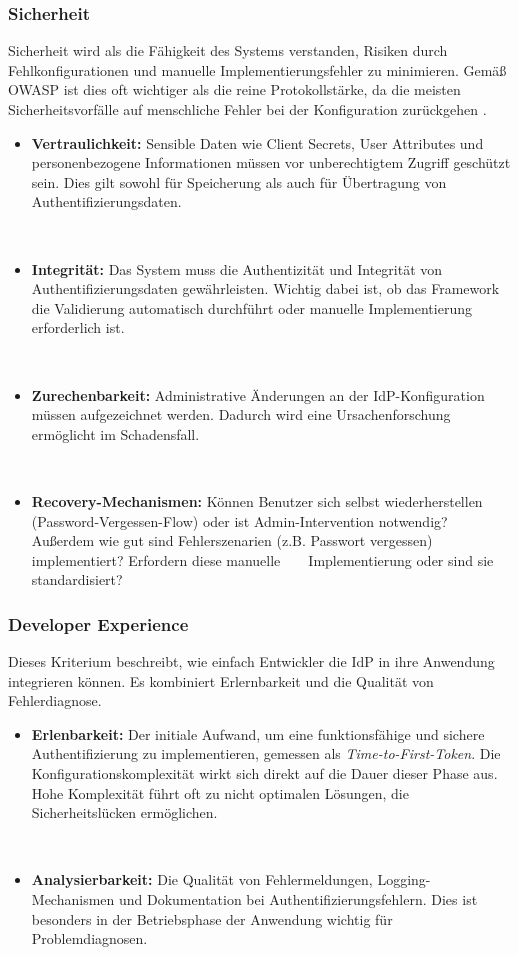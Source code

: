 \subsubsection{Sicherheit}

Sicherheit wird als die Fähigkeit des Systems verstanden, Risiken durch Fehlkonfigurationen und manuelle Implementierungsfehler zu minimieren. Gemäß \ac{OWASP} ist dies oft wichtiger als die reine Protokollstärke, da die meisten Sicherheitsvorfälle auf menschliche Fehler bei der Konfiguration zurückgehen \citep{Dietrich2018}.

\begin{itemize}
    \item \textbf{Vertraulichkeit:} Sensible Daten wie Client Secrets, User Attributes und personenbezogene Informationen müssen vor unberechtigtem Zugriff geschützt sein. Dies gilt sowohl für Speicherung als auch für Übertragung von Authentifizierungsdaten.

    \item \textbf{Integrität:} Das System muss die Authentizität und Integrität von Authentifizierungsdaten gewährleisten. Wichtig dabei ist, ob das Framework die Validierung automatisch durchführt oder manuelle Implementierung erforderlich ist.

    \item \textbf{Zurechenbarkeit:} Administrative Änderungen an der \ac{IdP}-Konfiguration müssen aufgezeichnet werden. Dadurch wird eine Ursachenforschung ermöglicht im Schadensfall.

    \item \textbf{Recovery-Mechanismen:} Können Benutzer sich selbst wiederherstellen
    (Password-Vergessen-Flow) oder ist Admin-Intervention notwendig? Außerdem wie gut sind Fehlerszenarien (z.B. Passwort vergessen) implementiert? Erfordern diese manuelle
    Implementierung oder sind sie standardisiert?
\end{itemize}

\subsubsection{Developer Experience}

Dieses Kriterium beschreibt, wie einfach Entwickler die \ac{IdP} in ihre Anwendung integrieren können. Es kombiniert Erlernbarkeit und die Qualität von Fehlerdiagnose.

\begin{itemize}
    \item \textbf{Erlenbarkeit:} Der initiale Aufwand, um eine funktionsfähige und sichere Authentifizierung zu implementieren, gemessen als \textit{Time-to-First-Token}. Die Konfigurationskomplexität wirkt sich direkt auf die Dauer dieser Phase aus. Hohe Komplexität führt oft zu nicht optimalen Lösungen, die Sicherheitslücken ermöglichen.

    \item \textbf{Analysierbarkeit:} Die Qualität von Fehlermeldungen, Logging-Mechanismen und Dokumentation bei Authentifizierungsfehlern. Dies ist besonders in der Betriebsphase der Anwendung wichtig für Problemdiagnosen.
\end{itemize}

